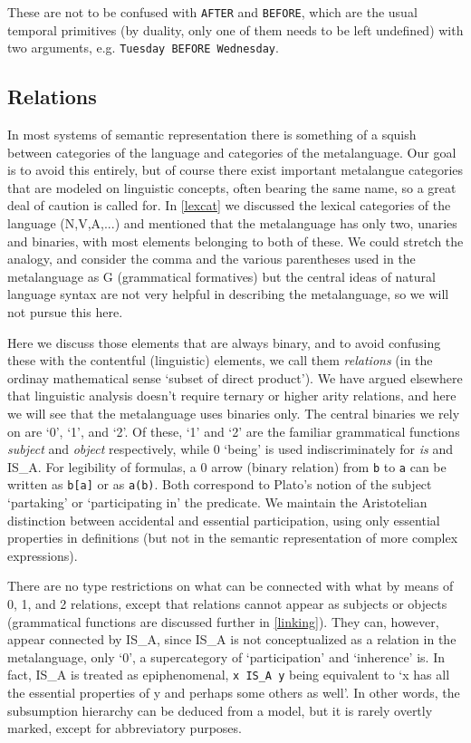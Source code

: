 \documentclass[11pt,bookmarks,bookmarksnumbered,naturalnames,plainpages=false,pdftex,colorlinks=true,urlcolor=blue,bookmarksdepth=subsection,plainpages=false]{paper}
\begin{document}
\noindent
These are not to be confused with {\tt AFTER} and {\tt BEFORE}, which are the
usual temporal primitives (by duality, only one of them needs to be left
undefined) with two arguments, e.g. {\tt Tuesday BEFORE Wednesday}.


\subsection{Relations}\label{rel}

In most systems of semantic representation there is something of a squish
between categories of the language and categories of the metalanguage. Our
goal is to avoid this entirely, but of course there exist important metalangue
categories that are modeled on linguistic concepts, often bearing the same
name, so a great deal of caution is called for. In \ref{lexcat} we discussed
the lexical categories of the language (N,V,A,...) and mentioned that the
metalanguage has only two, unaries and binaries, with most elements belonging
to both of these. We could stretch the analogy, and consider the comma and the
various parentheses used in the metalanguage as G (grammatical formatives) but
the central ideas of natural language syntax are not very helpful in
describing the metalanguage, so we will not pursue this here.

Here we discuss those elements that are always binary, and to avoid confusing
these with the contentful (linguistic) elements, we call them {\it relations}
(in the ordinay mathematical sense `subset of direct product'). We have argued
elsewhere \citep{Kornai:2012} that linguistic analysis doesn't require ternary
or higher arity relations, and here we will see that the metalanguage uses
binaries only. The central binaries we rely on are `0', `1', and `2'. Of
these, `1' and `2' are the familiar grammatical functions {\it subject} and
{\it object} respectively, while 0 `being' is used indiscriminately for {\it
  is} and IS\_A. For legibility of formulas, a 0 arrow (binary relation) from
{\tt b} to {\tt a} can be written as {\tt b[a]} or as {\tt a(b)}. Both
correspond to Plato's notion of the subject `partaking' or `participating in'
the predicate. We maintain the Aristotelian distinction between accidental and
essential participation, using only essential properties in definitions (but
not in the semantic representation of more complex expressions).

There are no type restrictions on what can be connected with what by means of
0, 1, and 2 relations, except that relations cannot appear as subjects or
objects (grammatical functions are discussed further in \ref{linking}). They
can, however, appear connected by IS\_A, since IS\_A is not conceptualized as
a relation in the metalanguage, only `0', a supercategory of `participation'
and `inherence' is. In fact, IS\_A is treated as epiphenomenal, {\tt x IS\_A
  y} being equivalent to `x has all the essential properties of y and perhaps
some others as well'. In other words, the subsumption hierarchy can be deduced
from a model, but it is rarely overtly marked, except for abbreviatory
purposes.
\end{document}
